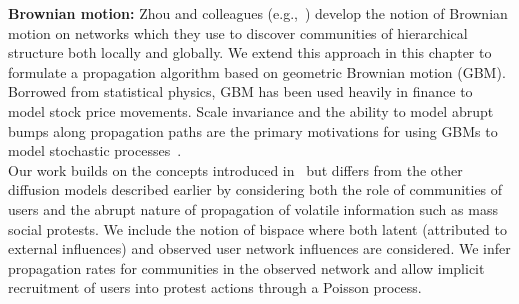 \vspace{-0.1in}
\noindent
{\bf Brownian motion:}
Zhou and colleagues (e.g.,~\cite{zhou2003distance, zhou2003network,
zhou2004network}) develop the notion of Brownian motion on networks
which they
use to discover communities of hierarchical structure both locally
and globally. We extend this approach in this chapter
to formulate a propagation algorithm based on geometric Brownian
motion (GBM). Borrowed from statistical physics, GBM has been
used heavily in finance to model stock price movements.
Scale invariance and the ability to model abrupt bumps
along propagation paths are the primary motivations for using GBMs
to model stochastic processes~\cite{tankov2004financial}. \\

\vspace{-0.1in}
\noindent
Our work builds on the concepts
introduced in~\cite{zhou2003network, iwata2013discovering, zhou2003distance, zhou2004network} but differs from the other diffusion models
described earlier by considering both the role of communities of
users and the abrupt nature of propagation of volatile information such as mass social protests. We include the notion of bispace where both latent (attributed to external influences) and observed user network influences are considered. We infer propagation rates for communities in the observed network and allow
implicit recruitment of users into protest actions through a Poisson process.
